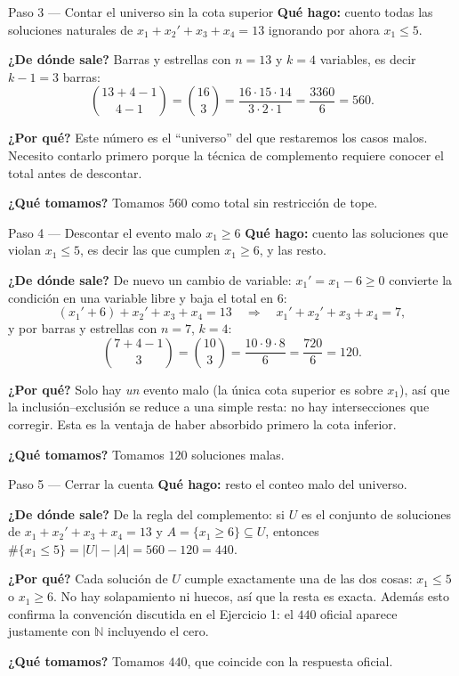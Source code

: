 \documentclass[11pt]{article}
\begin{document}
\begin{paso}{Paso 3 --- Contar el universo sin la cota superior}
\textbf{Qué hago:} cuento todas las soluciones naturales de $x_1+x_2'+x_3+x_4=13$ ignorando por ahora
$x_1\le 5$.

\textbf{¿De dónde sale?} Barras y estrellas con $n=13$ y $k=4$ variables, es decir $k-1=3$ barras:
\[
\binom{13+4-1}{4-1}=\binom{16}{3}=\frac{16\cdot 15\cdot 14}{3\cdot 2\cdot 1}
=\frac{3360}{6}=560.
\]

\textbf{¿Por qué?} Este número es el ``universo'' del que restaremos los casos malos. Necesito
contarlo primero porque la técnica de complemento requiere conocer el total antes de descontar.

\textbf{¿Qué tomamos?} Tomamos $560$ como total sin restricción de tope.
\end{paso}

\begin{paso}{Paso 4 --- Descontar el evento malo $x_1\ge 6$}
\textbf{Qué hago:} cuento las soluciones que violan $x_1\le 5$, es decir las que cumplen $x_1\ge 6$, y
las resto.

\textbf{¿De dónde sale?} De nuevo un cambio de variable: $x_1'=x_1-6\ge 0$ convierte la condición en
una variable libre y baja el total en $6$:
\[
(x_1'+6)+x_2'+x_3+x_4=13 \quad\Longrightarrow\quad x_1'+x_2'+x_3+x_4=7,
\]
y por barras y estrellas con $n=7$, $k=4$:
\[
\binom{7+4-1}{3}=\binom{10}{3}=\frac{10\cdot 9\cdot 8}{6}=\frac{720}{6}=120.
\]

\textbf{¿Por qué?} Solo hay \emph{un} evento malo (la única cota superior es sobre $x_1$), así que la
inclusión--exclusión se reduce a una simple resta: no hay intersecciones que corregir. Esta es la
ventaja de haber absorbido primero la cota inferior.

\textbf{¿Qué tomamos?} Tomamos $120$ soluciones malas.
\end{paso}

\begin{paso}{Paso 5 --- Cerrar la cuenta}
\textbf{Qué hago:} resto el conteo malo del universo.

\textbf{¿De dónde sale?} De la regla del complemento: si $U$ es el conjunto de soluciones de
$x_1+x_2'+x_3+x_4=13$ y $A=\{x_1\ge 6\}\subseteq U$, entonces
$\#\{x_1\le 5\}=|U|-|A|=560-120=440$.

\textbf{¿Por qué?} Cada solución de $U$ cumple exactamente una de las dos cosas: $x_1\le 5$ o
$x_1\ge 6$. No hay solapamiento ni huecos, así que la resta es exacta. Además esto confirma la
convención discutida en el Ejercicio 1: el $440$ oficial aparece justamente con $\mathbb{N}$
incluyendo el cero.

\textbf{¿Qué tomamos?} Tomamos $440$, que coincide con la respuesta oficial.
\end{paso}
\end{document}
